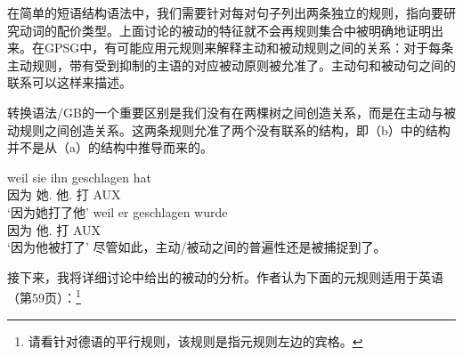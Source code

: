 \noindent
在简单的短语结构语法中，我们需要针对每对句子列出两条独立的规则，指向要研究动词的配价类型。上面讨论的被动的特征就不会再规则集合中被明确地证明出来。在GPSG中，有可能应用元规则来解释主动和被动规则之间的关系：对于每条主动规则，带有受到抑制的主语的对应被动原则被允准了。主动句和被动句之间的联系可以这样来描述。

转换语法/GB\indexgb \indexmp 的一个重要区别是我们没有在两棵树之间创造关系，而是在主动与被动规则之间创造关系。这两条规则允准了两个没有联系的结构，即（b）中的结构并不是从（a）的结构中推导而来的。

\eal
\ex 
\gll weil sie ihn geschlagen hat\\
     因为 她.\nom{} 他.\acc{} 打 AUX\\
\glt `因为她打了他'
\ex 
\gll weil er geschlagen wurde\\
     因为 他.\nom{} 打 AUX\\
\glt `因为他被打了'
\zl
%
尽管如此，主动/被动之间的普遍性还是被捕捉到了。

接下来，我将详细讨论中给出的被动的分析。作者认为下面的元规则适用于英语（第59页）：\footnote{
请看针对德语的平行规则，该规则是指元规则左边的宾格。
}

